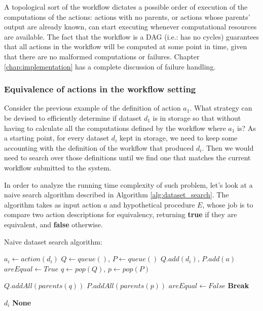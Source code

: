 A topological sort of the workflow dictates a possible order of execution of the computations of the actions: actions with no parents, or actions whose parents' output are already known, can start executing whenever computational resources are available. The fact that the workflow is a DAG (i.e.: has no cycles) guarantees that all actions in the workflow will be computed at some point in time, given that there are no malformed computations or failures.  Chapter \ref{chap:implementation} has a complete discussion of failure handling.

\subsubsection{Equivalence of actions in the workflow setting}
Consider the previous example of the definition of action $a_1$. What strategy can be devised to efficiently determine if dataset $d_1$ is in storage so that without having to calculate all the computations defined by the workflow where $a_1$ is? As a starting point, for every dataset $d_i$ kept in storage, we need to keep some accounting with the definition of the workflow that produced $d_i$.  Then we would need to search over those definitions until we find one that matches the current workflow submitted to the system.  

In order to analyze the running time complexity of such problem, let's look at a naive search algorithm described in Algorithm \ref{alg:dataset_search}. The algorithm takes as input action $a$ and hypothetical procedure $E$, whose job is to compare two action descriptions for equivalency, returning \textbf{true} if they are equivalent, and \textbf{false} otherwise.


\begin{algorithm}
\begin{singlespace}
\caption{Naive dataset search algorithm:}
\label{alg:dataset_search}
\begin{algorithmic}[1]
		\State $a_i \gets action(d_i)$ 
		\State $Q \gets queue()$, $P \gets queue()$
		\State $Q.add(d_i)$, $P.add(a)$
		\State $areEqual \gets True$
			\State $q \gets pop(Q)$, $p \gets pop(P)$
			
				\State $Q.addAll(parents(q))$ 
				\State $P.addAll(parents(p))$ 
			\Else
				\State $areEqual \gets False$
				\State \textbf{Break}
			\EndIf
			
		\EndWhile
			\Return $d_i$
		\EndIf
	\EndFor
	\Return \textbf{None}
\EndProcedure
\end{algorithmic}
\end{singlespace}
\end{algorithm}

